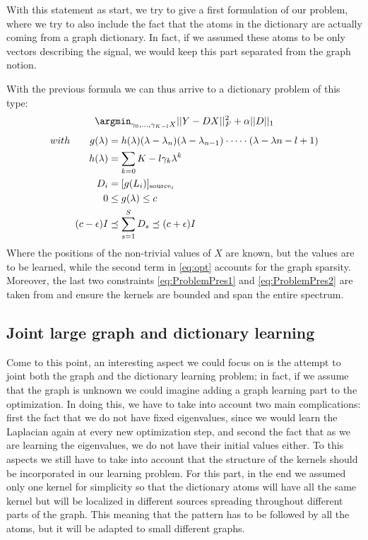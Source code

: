 With this statement as start, we try to give a first formulation of our problem, where we try to also include the fact that the atoms in the dictionary are actually coming from a graph dictionary. In fact, if we assumed these atoms to be only vectors describing the signal, we would keep this part separated from the graph notion.

With the previous formula we can thus arrive to a dictionary problem of this type:
\begin{equation}
\argmin_{\gamma_0,\dots,\gamma_{K-l}X} ||Y - DX||^2_F + \alpha||D||_1
\label{eq:opt}
\end{equation}
\begin{align}
with \qquad g(\lambda) &= h(\lambda)(\lambda - \lambda_n)(\lambda - \lambda_{n-1})\cdot \dots \cdot (\lambda - \lambda{n-l+1}) \notag\\
h(\lambda) &= \sum_{k=0}{K-l}\gamma_k\lambda^{k} \notag\\
D_i &= [g(L_i)]_{\text{source}_i} \notag\\
0 &\leq g(\lambda) \leq c \label{eq:ProblemPres1}\\
(c-\epsilon)I &\preceq \sum_{s=1}^{S}D_s \preceq (c+\epsilon)I \label{eq:ProblemPres2}
\end{align}
Where the positions of the non-trivial values of $X$ are known, but the values are to be learned, while the second term in \autoref{eq:opt} accounts for the graph sparsity. Moreover, the last two constraints \ref{eq:ProblemPres1} and \ref{eq:ProblemPres2} are taken from \cite{Thanou2014} and ensure the kernels are bounded and span the entire spectrum.
\label{sec:DictionaryLearningSection}

\subsection{Joint large graph and dictionary learning}
Come to this point, an interesting aspect we could focus on is the attempt to joint both the graph and the dictionary learning problem; in fact, if we assume that the graph is unknown we could imagine adding a graph learning part to the optimization. In doing this, we have to take into account two main complications: first the fact that we do not have fixed eigenvalues, since we would learn the Laplacian again at every new optimization step, and second the fact that as we are learning the eigenvalues, we do not have their initial values either. To this aspects we still have to take into account that the structure of the kernels should be incorporated in our learning problem. For this part, in the end we assumed only one kernel for simplicity so that the dictionary atoms will have all the same kernel but will be localized in different sources spreading throughout different parts of the graph. This meaning that the pattern has to be followed by all the atoms, but it will be adapted to small different graphs.

